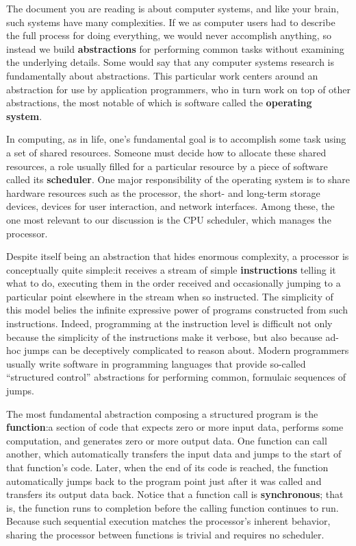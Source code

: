 \documentclass[12pt,letterpaper,openright]{report}
\begin{document}
The document you are reading is about computer systems, and like your brain, such
systems have many complexities.  If we as computer users had to describe the full
process for doing everything, we would never accomplish anything, so instead we
build \textbf{abstractions} for performing common tasks without examining the
underlying details.  Some would say that any computer systems research is
fundamentally about abstractions.  This particular work centers around an abstraction
for use by application programmers, who in turn work on top of other abstractions,
the most notable of which is software called the \textbf{operating system}.

In computing, as in life, one's fundamental goal is to accomplish some task using a
set of shared resources.  Someone must decide how to allocate these shared resources,
a role usually filled for a particular resource by a piece of software called its
\textbf{scheduler}.  One major responsibility of the operating system is to share
hardware resources such as the processor, the short- and long-term storage devices,
devices for user interaction, and network interfaces.  Among these, the one most
relevant to our discussion is the CPU scheduler, which manages the processor.

Despite itself being an abstraction that hides enormous complexity, a processor is
conceptually quite simple:\@ it receives a stream of simple \textbf{instructions}
telling it what to do, executing them in the order received and occasionally jumping
to a particular point elsewhere in the stream when so instructed.  The simplicity of
this model belies the infinite expressive power of programs constructed from such
instructions.  Indeed, programming at the instruction level is difficult not only
because the simplicity of the instructions make it verbose, but also because ad-hoc
jumps can be deceptively complicated to reason about.  Modern programmers usually
write software in programming languages that provide so-called ``structured control''
abstractions for performing common, formulaic sequences of jumps.

The most fundamental abstraction composing a structured program is the
\textbf{function}:\@ a section of code that expects zero or more input data, performs
some computation, and generates zero or more output data.  One function can call
another, which automatically transfers the input data and jumps to the start of that
function's code.  Later, when the end of its code is reached, the function
automatically jumps back to the program point just after it was called and transfers
its output data back.  Notice that a function call is \textbf{synchronous}; that is,
the function runs to completion before the calling function continues to run.
Because such sequential execution matches the processor's inherent behavior, sharing
the processor between functions is trivial and requires no scheduler.
\end{document}
